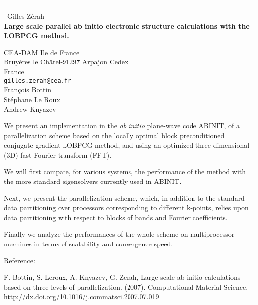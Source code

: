\documentclass{report}
\begin{document}
\begin{center}
\rule{6in}{1pt} \
{\large Gilles Z\'{e}rah \\
{\bf Large scale parallel ab initio electronic structure calculations with the LOBPCG method.}}

CEA-DAM Ile de France \\ Bruy\`{e}res le Ch\^{a}tel-91297 Arpajon Cedex \\ France
\\
{\tt gilles.zerah@cea.fr}\\
Fran\c{c}ois Bottin\\
St\'{e}phane Le Roux\\
	Andrew Knyazev \end{center}

We present an implementation in the {\it ab initio} plane-wave code
ABINIT, of a parallelization scheme based on the locally optimal block
preconditioned conjugate gradient LOBPCG method, and using an optimized
three-dimensional (3D) fast Fourier transform (FFT).

We will first compare, for various systems, the performance of the method
with the more standard eigensolvers currently used in ABINIT.

Next, we present the parallelization scheme, which, in addition to the
standard data partitioning over processors corresponding to different
k-points, relies upon data partitioning with respect to blocks of bands
and Fourier coefficients.

Finally we analyze the performances of the whole scheme on multiprocessor
machines in terms of scalability and convergence speed.


Reference:

F. Bottin, S. Leroux, A. Knyazev, G. Zerah, Large scale ab initio
calculations based on three levels of parallelization. (2007).
Computational Material Science.
http://dx.doi.org/10.1016/j.commatsci.2007.07.019
\end{document}
